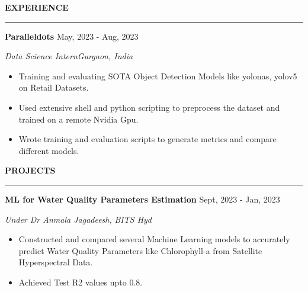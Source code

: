 \documentclass[a4paper,12pt]{report}
\newcommand{\marginAdj}{0.5in}
\begin{document}
 \par
 \vspace{9pt}
 
\noindent 
\textbf{EXPERIENCE} \par
\vspace{2pt}
\hrule
\vspace{6pt}


\noindent 
\textbf{Paralleldots}{\fontsize{9pt}{9pt}\selectfont \hspace*{4.30in} \hspace*{\marginAdj} {\fontsize{12pt}{12pt}\selectfont May, 2023 - Aug, 2023}} \par
\noindent 
{\fontsize{12pt}{12pt}\selectfont \textit{Data Science Intern}\hfill\textit{Gurgaon, India}} \par
\noindent 
\begin{itemize}[noitemsep,topsep=0pt]
    \item {\fontsize{12pt}{12pt}\selectfont Training and evaluating SOTA Object Detection Models like yolonas, yolov5 on Retail Datasets.} \par
    \noindent
    \item {\fontsize{12pt}{12pt}\selectfont Used extensive shell and python scripting to preprocess the dataset and trained on a remote Nvidia Gpu.} \par
    \noindent 
    \item {\fontsize{12pt}{12pt}\selectfont Wrote training and evaluation scripts to generate metrics and compare different models. } \par
    \noindent
\end{itemize}



 \par
\vspace{9pt}



\noindent 
\textbf{PROJECTS} \par
\vspace{2pt}
\hrule
\vspace{6pt}

\noindent
\textbf{ML for Water Quality Parameters Estimation} \hspace*{\marginAdj} \hspace*{1.90in} {\fontsize{12pt}{12pt}\selectfont Sept, 2023 - Jan, 2023} \par
\par
\noindent 
{\fontsize{12pt}{12pt}\selectfont \textit{Under Dr Anmala Jagadeesh,}\hfill\textit{ BITS Hyd}} \par
\noindent 
\begin{itemize}[noitemsep,topsep=0pt]
    \item {\fontsize{12pt}{12pt}\selectfont Constructed and compared several Machine Learning models to accurately predict Water Quality Parameters like Chlorophyll-a from Satellite Hyperspectral Data.} \par
    \item {\fontsize{12pt}{12pt}\selectfont Achieved Test R2 values upto 0.8.} \par
\end{itemize}
\end{document}
